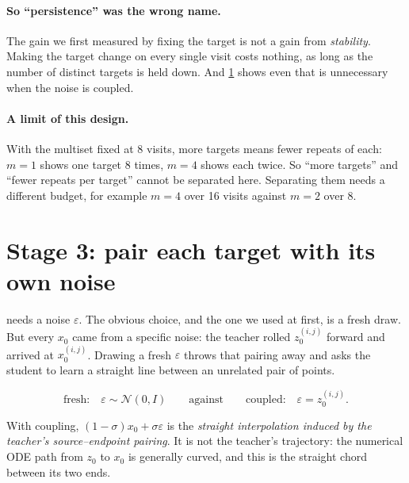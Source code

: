 \documentclass[11pt]{article}
\newcommand{\obs}[1]{\textcolor{obsblue}{#1}}
\begin{document}
\paragraph{So ``persistence'' was the wrong name.}
The gain we first measured by fixing the target is not a gain from \emph{stability}. Making the
target change on every single visit costs nothing, as long as the number of distinct targets is held
down. And \cref{sec:stage3} shows even that is unnecessary when the noise is coupled.

\paragraph{A limit of this design.}
With the multiset fixed at \obs{8} visits, more targets means fewer repeats of each: $m=1$ shows one
target \obs{8} times, $m=4$ shows each twice. So ``more targets'' and ``fewer repeats per target''
cannot be separated here. Separating them needs a different budget, for example $m=4$ over
\obs{16} visits against $m=2$ over \obs{8}.


\section{Stage 3: pair each target with its own noise}
\label{sec:stage3}

 needs a noise $\varepsilon$. The obvious choice, and the one we used at first, is a
fresh draw. But every $x_0$ came from a specific noise: the teacher rolled $z_0^{(i,j)}$ forward and
arrived at $x_0^{(i,j)}$. Drawing a fresh $\varepsilon$ throws that pairing away and asks the student
to learn a straight line between an unrelated pair of points.

\begin{equation}
  \text{fresh:}\quad \varepsilon\sim\mathcal N(0,I)
  \qquad\text{against}\qquad
  \text{coupled:}\quad \varepsilon = z_0^{(i,j)} .
\label{eq:coupling}
\end{equation}

With coupling, $(1-\sigma)x_0+\sigma\varepsilon$ is the \emph{straight interpolation induced by the
teacher's source--endpoint pairing}. It is not the teacher's trajectory: the numerical ODE path from
$z_0$ to $x_0$ is generally curved, and this is the straight chord between its two ends.
\end{document}
